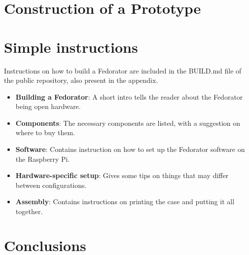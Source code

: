     \section{Construction of a Prototype}
        \blind[3]
    \section{Simple instructions}
        Instructions on how to build a Fedorator are included in the BUILD.md file of the public repository, also present in the appendix.
        
        \begin{itemize}
            \item \textbf{Building a Fedorator}: A short intro tells the reader about the Fedorator being open hardware.
            \item \textbf{Components}: The necessary components are listed, with a suggestion on where to buy them.
            \item \textbf{Software}: Contains instruction on how to set up the Fedorator software on the Raspberry Pi.
            \item \textbf{Hardware-specific setup}: Gives some tips on things that may differ between configurations.
            \item \textbf{Assembly}: Contains instructions on printing the case and putting it all together.
        \end{itemize}
        
        
        \begin{comment}
        \todo{These are the final instructions that will be the "result" of the work.  Should they be inlined here?}
        \subsection{Bill of Materials}
            \todo{What is needed to get started - include a table and cost}
            \blind[3]
        \subsection{Step-by-step tutorial}
            \todo{The meat: how to build it from grounds up}
            \todo{Will not be present here, rather as an attachment.}
        \end{comment}
    \section{Conclusions}
        
        \blind[2]

